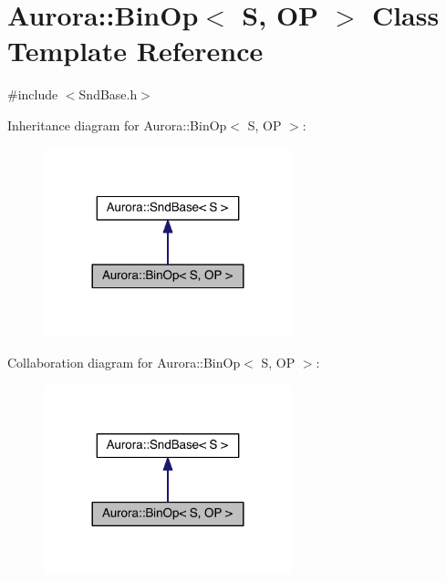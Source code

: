 \hypertarget{class_aurora_1_1_bin_op}{}\section{Aurora\+:\+:Bin\+Op$<$ S, OP $>$ Class Template Reference}
\label{class_aurora_1_1_bin_op}


{\ttfamily \#include $<$Snd\+Base.\+h$>$}



Inheritance diagram for Aurora\+:\+:Bin\+Op$<$ S, OP $>$\+:\nopagebreak
\begin{figure}[H]
\begin{center}
\leavevmode
\includegraphics[width=204pt]{class_aurora_1_1_bin_op__inherit__graph}
\end{center}
\end{figure}


Collaboration diagram for Aurora\+:\+:Bin\+Op$<$ S, OP $>$\+:\nopagebreak
\begin{figure}[H]
\begin{center}
\leavevmode
\includegraphics[width=204pt]{class_aurora_1_1_bin_op__coll__graph}
\end{center}
\end{figure}

